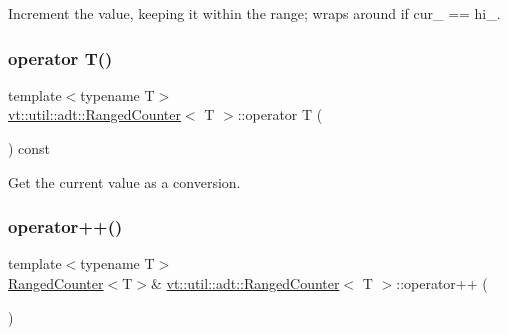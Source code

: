 Increment the value, keeping it within the range; wraps around if {\ttfamily cur\+\_\+} == hi\+\_\+. 

\mbox{\label{structvt_1_1util_1_1adt_1_1_ranged_counter_a498b9085058b66b12733dc40fe20b17a}} 
\subsubsection{\texorpdfstring{operator T()}{operator T()}}
{\footnotesize\ttfamily template$<$typename T$>$ \\
\hyperlink{structvt_1_1util_1_1adt_1_1_ranged_counter}{vt\+::util\+::adt\+::\+Ranged\+Counter}$<$ T $>$\+::operator T (\begin{DoxyParamCaption}{ }\end{DoxyParamCaption}) const\hspace{0.3cm}{\ttfamily [inline]}}



Get the current value as a conversion. 

\mbox{\label{structvt_1_1util_1_1adt_1_1_ranged_counter_a41f5e2ae9bdb7b47adc3e70214e26063}} 
\subsubsection{\texorpdfstring{operator++()}{operator++()}\hspace{0.1cm}{\footnotesize\ttfamily [1/2]}}
{\footnotesize\ttfamily template$<$typename T$>$ \\
\hyperlink{structvt_1_1util_1_1adt_1_1_ranged_counter}{Ranged\+Counter}$<$T$>$\& \hyperlink{structvt_1_1util_1_1adt_1_1_ranged_counter}{vt\+::util\+::adt\+::\+Ranged\+Counter}$<$ T $>$\+::operator++ (\begin{DoxyParamCaption}{ }\end{DoxyParamCaption})\hspace{0.3cm}{\ttfamily [inline]}}



